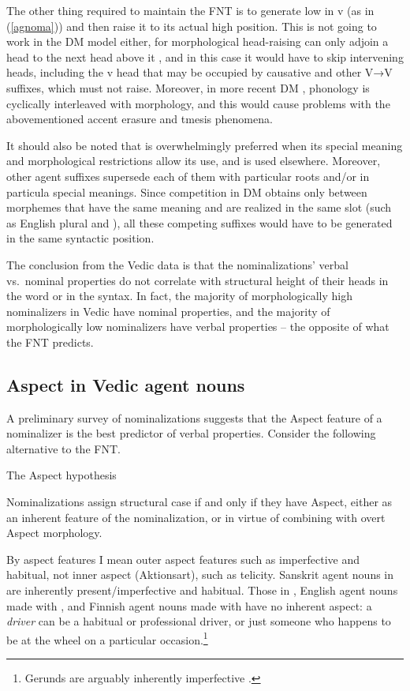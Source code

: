 \documentclass[output=paper,
modfonts
]{LSP/langsci}
\newcommand{\rf}[1]{(\ref{#1})}
\def\urf#1{$^{\textrm{\scriptsize{#1}}}$}
\begin{document}
The other thing required to maintain the FNT is to generate \form{-{tár-}\urf{N}} low in v
(as in \rf{agnoma}) and then raise it to its actual high position.  This is not going to work
in the DM model either, for morphological head-raising can only adjoin a head to the next head
above it \citep{harizanov2016}, and in this case it would have to skip intervening heads,
including the v head that may be occupied by causative and other V→V suffixes, which must not
raise.  Moreover, in more recent DM \citep{embick2010}, phonology is cyclically interleaved with
morphology, and this would cause problems with the abovementioned accent erasure and tmesis
phenomena.

It should also be noted that \form{′-{tar-}\urf{V}} is overwhelmingly preferred when its
special meaning and morphological restrictions allow its use, and \form{-{tár-}\urf{N}} is
used elsewhere. Moreover, other agent suffixes supersede each of them with particular roots
and/or in particula special meanings. Since competition in DM obtains only between morphemes
that have the same meaning and are realized in the same slot (such as English plural
 and ), all these competing suffixes would have to be generated in the
same syntactic position.

The conclusion from the Vedic data is that the nominalizations' verbal vs.\ nominal properties
do not correlate with structural height of their heads in the word or in the syntax.  In fact,
the majority of morphologically high nominalizers in Vedic have nominal properties, and the
majority of morphologically low nominalizers have verbal properties – the opposite of what the FNT
predicts.


\subsection{Aspect in Vedic agent nouns}
\label{vedtensesection}
A preliminary survey of nominalizations suggests that the Aspect feature of a
nominalizer is the best predictor of verbal properties.  Consider the following alternative to
the FNT.
\begin{exe}
\ex\label{TAH}
The Aspect hypothesis

Nominalizations assign structural case if and only if they have Aspect, either as an
inherent feature of the nominalization, or in virtue of combining with overt Aspect morphology.
\end{exe}
By aspect features I mean outer aspect features such as imperfective and habitual, not inner
aspect (Aktionsart), such as telicity.  Sanskrit agent nouns in \form{′-tar-\urf{V}} are
inherently present/imperfective and habitual.  Those in \form{-{tár-}\urf{N}}, English
agent nouns made with  , and Finnish agent nouns made with
 have no inherent aspect: a \textit{driver} can be a habitual or professional
driver, or just someone who happens to be at the wheel on a particular
occasion.\footnote{Gerunds are arguably inherently imperfective \citep{alexiadou2001,alexiadou2010}.}
\end{document}

